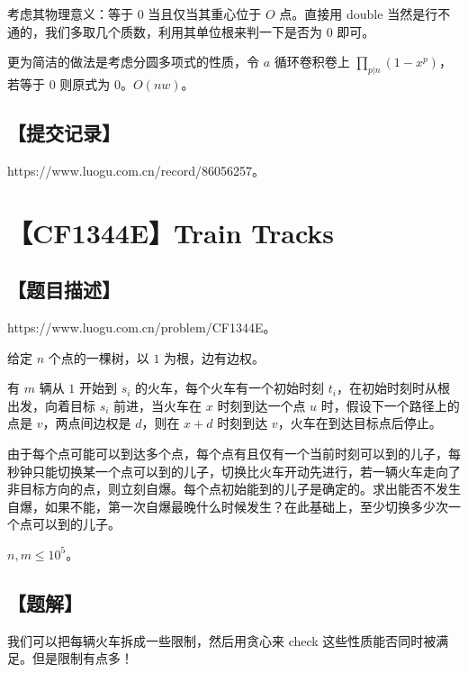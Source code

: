 \documentclass[UTF8,12pt,a4paper]{ctexart}
\begin{document}
	考虑其物理意义：等于 $0$ 当且仅当其重心位于 $O$ 点。直接用 double 当然是行不通的，我们多取几个质数，利用其单位根来判一下是否为 $0$ 即可。
	
	更为简洁的做法是考虑分圆多项式的性质，令 $a$ 循环卷积卷上 $\prod_{p|n}\left(1-x^p\right)$，若等于 $0$ 则原式为 $0$。$O(nw)$。
	
	\subsection*{【提交记录】}
	
	https://www.luogu.com.cn/record/86056257。
	
	
	\section*{【CF1344E】Train Tracks}
	
	\subsection*{【题目描述】}
	
	https://www.luogu.com.cn/problem/CF1344E。
	
	给定 $n$ 个点的一棵树，以 $1$ 为根，边有边权。
	
	有 $m$ 辆从 $1$ 开始到 $s_i$ 的火车，每个火车有一个初始时刻 $t_i$，在初始时刻时从根出发，向着目标 $s_i$ 前进，当火车在 $x$ 时刻到达一个点 $u$ 时，假设下一个路径上的点是 $v$，两点间边权是 $d$，则在 $x+d$ 时刻到达 $v$，火车在到达目标点后停止。
	
	由于每个点可能可以到达多个点，每个点有且仅有一个当前时刻可以到的儿子，每秒钟只能切换某一个点可以到的儿子，切换比火车开动先进行，若一辆火车走向了非目标方向的点，则立刻自爆。每个点初始能到的儿子是确定的。求出能否不发生自爆，如果不能，第一次自爆最晚什么时候发生？在此基础上，至少切换多少次一个点可以到的儿子。
	
	$n,m\le 10^5$。
	
	\subsection*{【题解】}
	
	我们可以把每辆火车拆成一些限制，然后用贪心来 check 这些性质能否同时被满足。但是限制有点多！
	
\end{document}

